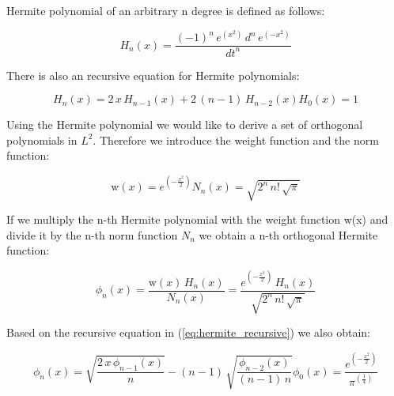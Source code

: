\documentclass[12pt,twoside,a4paper]{article}
\numberwithin{equation}{subsection}
\numberwithin{figure}{subsection}
\begin{document}
Hermite polynomial of an arbitrary n degree is defined as follows:

\begin{equation} \label{eq:hermite_definition}
	H_n(x) = \frac {( - 1)^{n} \, e ^ {(x ^ 2)} \, d ^ n \, e^{( - x ^ 2)} } {{dt}^{n}}
\end{equation}

There is also an recursive equation for Hermite polynomials:

\begin{subequations} \label{eq:hermite_recursive}
  \begin{equation}   \label{eq:hrec_next}
    H_n (x) = 2 \, x \, H_{n - 1}(x) + 2 \, (n - 1) \, H_{n - 2}(x)
  \end{equation}
  \begin{equation}   \label{eq:hrec_first}
    H_0 (x) = 1
  \end{equation}
\end{subequations}

Using the Hermite polynomial we would like to derive a set of orthogonal polynomials in $L ^ 2$. Therefore we introduce the
weight function and the norm function:

\begin{subequations} \label{eq:hermite_weight}
  \begin{equation}   \label{eq:hwht_weight}
    \mathrm{w}(x) = e^{( - \frac {x^{2}}{2})}
  \end{equation}
  \begin{equation}   \label{eq:hwht_iter}
    N_n (x) = \sqrt{2^{n} \, n\mathrm{!} \, \sqrt{\pi }}
  \end{equation}
\end{subequations}

If we multiply the n-th Hermite polynomial with the weight function w(x) and divide it by the n-th norm function $N_n$ we
obtain a n-th orthogonal Hermite function:

\begin{equation} \label{eq:hermite_orthogonal}
  \phi_n (x) = \frac {\mathrm{w}(x) \, H_n (x)} {N_n (x)} 
  	= \frac {e^{( - \frac {x ^ 2}{2})} \, H_n (x)} {\sqrt{2^{n} \, n\mathrm{!} \, \sqrt {\pi }}}
\end{equation}

Based on the recursive equation in (\ref{eq:hermite_recursive}) we also obtain:

\begin{subequations} \label{eq:hermite_recresult}
  \begin{equation}   \label{eq:hrr_weight}
    \phi_n (x) = \sqrt{\frac {2 \, x \, {\phi_{n - 1}}(x)}{n}} - (n - 1) \, \sqrt{\frac {{\phi_{n - 2}}(x)} {(n - 1) \, n}}
  \end{equation}
  \begin{equation}   \label{eq:hrr_iter}
    \phi_0 (x) = \frac {e^{( - \frac {x ^ 2} {2})}} {\pi ^{(\frac {1}{4})}}
  \end{equation}
\end{subequations}
\end{document}
